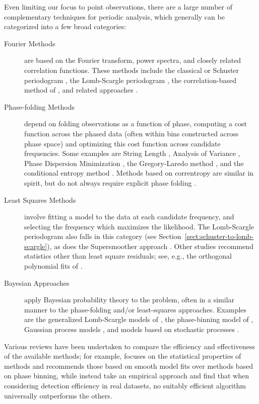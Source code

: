 \documentclass[preprint]{aastex}
\newcommand{\Sect}[1]{Section~\ref{sect:#1}}
\newcommand{\sect}[1]{\Sect{#1}}
\begin{document}
Even limiting our focus to point observations, there are a large number of
complementary techniques for periodic analysis, which generally can be
categorized into a few broad categories:
\begin{description}
  \item[Fourier Methods] are based on the Fourier transform, power spectra,
    and closely related correlation functions. These methods include the
    classical or Schuster periodogram \citep{Schuster98},
    the Lomb-Scargle periodogram
    \citep{Lomb76, Scargle82}, the correlation-based method of
    \citet{Edelson88}, and related approaches
    \citep[see also][for a discussion of wavelet transforms in this
      context]{Foster96}.
  \item[Phase-folding Methods] depend on folding
    observations as a function of phase, computing a cost function across
    the phased data (often within bins constructed across phase space)
    and optimizing this cost function across candidate frequencies.
    Some examples are
    String Length \citep{Dworetsky83},
    Analysis of Variance \citep{Schwarzenberg-Czerny89},
    Phase Dispersion Minimization \citep{Stellingwerf78},
    the Gregory-Laredo method \citep{Gregory92},
    and the conditional entropy method \citep{Graham2013}.
    Methods based on correntropy are similar in spirit, but do not always
    require explicit phase folding \citep{Huijse2011,Huijse2012}.
  \item[Least Squares Methods] involve fitting a model to the data at each
    candidate frequency, and selecting the frequency which maximizes the likelihood.
    The Lomb-Scargle periodogram also falls in this category
    (see \sect{schuster-to-lomb-scargle}), as does the Supersmoother approach
    \citep{Reimann94}. Other studies recommend statistics other than
    least square residuals; see, e.g., the orthogonal polynomial fits of
    \citet{Schwarzenberg-Czerny96}.
  \item[Bayesian Approaches] apply Bayesian probability theory to the problem,
    often in a similar manner to the phase-folding and/or least-squares
    approaches.
    Examples are the generalized Lomb-Scargle models of \citet{Bretthorst88},
    the phase-binning model of \citet{Gregory92}, Gaussian process models
    \citep[e.g.][]{Wang2012}, and models based on stochastic processes
    \citep[e.g.][]{Kelly14}.
\end{description}
Various reviews have been undertaken to compare the efficiency and effectiveness
of the available methods; for example, \citet{Schwarzenberg-Czerny99}
focuses on the statistical properties of methods and recommends those
based on smooth model fits over methods based on phase binning,
while \citet{Graham2013b} instead take an empirical approach and find that
when considering detection efficiency in real datasets, no suitably efficient
algorithm universally outperforms the others.
\end{document}
